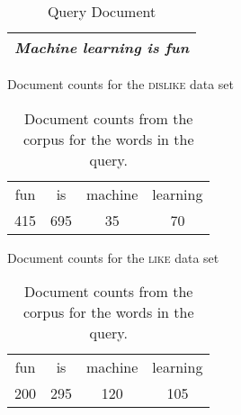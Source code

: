 \documentclass[solution]{ditpaper}
\begin{document}
\newpage

				
\begin{table}[h]
\caption{Query Document}
\centering
\begin{tabular}{l}
\hline
\textit{Machine learning is fun}\\
\hline
\end{tabular}
\label{tab:likedislikequery}
\end{table}

\begin{table}[!htb]
    \caption{Document counts from the corpus for the words in the query.}
    \begin{minipage}{.5\linewidth}
      \centering
Document counts for the \textsc{dislike} data set
\begin{tabular}{|c|c|c|c|}
\hline
fun & is & machine & learning\\
415 & 695 & 35 & 70\\
\hline
\end{tabular}
    \end{minipage}%
    \begin{minipage}{.5\linewidth}
      \centering
Document counts for the \textsc{like} data set
\begin{tabular}{|c|c|c|c|}
\hline
fun & is & machine & learning\\
200 & 295 & 120 & 105\\
\hline
\end{tabular}
    \end{minipage} 
    \label{tab:doccounts}
\end{table}
\end{document}
